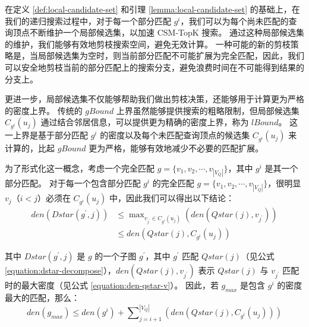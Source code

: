 在定义 \ref{def:local-candidate-set} 和引理 \ref{lemma:local-candidate-set} 的基础上，在我们的递归搜索过程中，对于每一个部分匹配 $g^i$，我们可以为每个尚未匹配的查询顶点不断维护一个局部候选集，以加速 CSM-TopK 搜索。
通过这种局部候选集的维护，我们能够有效地剪枝搜索空间，避免无效计算。
一种可能的新的剪枝策略是，当局部候选集为空时，则当前部分匹配不可能扩展为完全匹配，因此，我们可以安全地剪枝当前的部分匹配上的搜索分支，避免浪费时间在不可能得到结果的分支上。

更进一步，局部候选集不仅能够帮助我们做出剪枝决策，还能够用于计算更为严格的密度上界。
传统的 $gBound$ 上界虽然能够提供搜索的粗略限制，但局部候选集 $C_{g^i}(u_j)$ 通过结合邻居信息，可以提供更为精确的密度上界，称为 $lBound$。
这一上界是基于部分匹配 $g^i$ 的密度以及每个未匹配查询顶点的候选集 $C_{g^i}(u_j)$ 来计算的，比起 $gBound$ 更为严格，能够有效地减少不必要的匹配扩展。

为了形式化这一概念，考虑一个完全匹配 $g=\{v_1, v_2, \cdots, v_{|V_Q|}\}$，其中 $g^i$ 是其一个部分匹配。
对于每一个包含部分匹配 $g^i$ 的完全匹配 $g=\{v_1, v_2, \cdots, v_{|V_Q|}\}$，很明显 $v_j$（$i < j$）必须在 $C_{g^i}(u_j)$ 中，因此我们可以得出以下结论：
\begin{equation}
    \begin{aligned}
      den(Dstar(g^\prime, j)) & \leq \max\nolimits_{v_{j^\prime}\in C_{g^i}(u_j)}\left(den(Qstar(j), v_{j^\prime})\right) \\
        & \leq den(Qstar(j), C_{g^i}(u_j))
    \end{aligned}
\end{equation}


其中 $Dstar(g^\prime, j)$ 是 $g$ 的一个子图 $g^\prime$，其中 $g^\prime$ 匹配 $Qstar(j)$（见公式 \ref{equation:dstar-decompose}），$den(Qstar(j), v_{j^\prime})$ 表示 $Qstar(j)$ 与 $v_{j^\prime}$ 匹配时的最大密度（见公式 \ref{equation:den-qstar-v}）。
因此，若 $g_{max}$ 是包含 $g^i$ 的密度最大的匹配，那么：
\begin{equation}
	den(g_{max}) \leq den(g^i) + \sum\nolimits_{j=i+1}^{|V_Q|} \left(den(Qstar(j), C_{g^i}(u_j))\right)
\end{equation}

